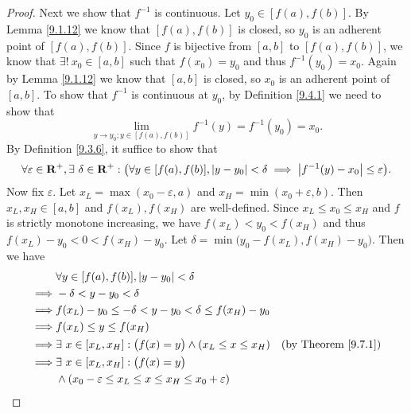 \begin{proof}
    Next we show that \(f^{-1}\) is continuous.
    Let \(y_0 \in [f(a), f(b)]\).
    By Lemma \ref{9.1.12} we know that \([f(a), f(b)]\) is closed, so \(y_0\) is an adherent point of \([f(a), f(b)]\).
    Since \(f\) is bijective from \([a, b]\) to \([f(a), f(b)]\), we know that \(\exists!\ x_0 \in [a, b]\) such that \(f(x_0) = y_0\) and thus \(f^{-1}(y_0) = x_0\).
    Again by Lemma \ref{9.1.12} we know that \([a, b]\) is closed, so \(x_0\) is an adherent point of \([a, b]\).
    To show that \(f^{-1}\) is continuous at \(y_0\), by Definition \ref{9.4.1} we need to show that
    \[
        \lim_{y \to y_0 ; y \in [f(a), f(b)]} f^{-1}(y) = f^{-1}(y_0) = x_0.
    \]
    By Definition \ref{9.3.6}, it suffice to show that
    \[
        \forall \varepsilon \in \mathbf{R}^+, \exists\ \delta \in \mathbf{R}^+ : \big(\forall y \in [f(a), f(b)], \abs*{y - y_0} < \delta \implies \abs*{f^{-1}(y) - x_0} \leq \varepsilon\big).
    \]
    Now fix \(\varepsilon\).
    Let \(x_L = \max(x_0 - \varepsilon, a)\) and \(x_H = \min(x_0 + \varepsilon, b)\).
    Then \(x_L, x_H \in [a, b]\) and \(f(x_L), f(x_H)\) are well-defined.
    Since \(x_L \leq x_0 \leq x_H\) and \(f\) is strictly monotone increasing, we have \(f(x_L) < y_0 < f(x_H)\) and thus \(f(x_L) - y_0 < 0 < f(x_H) - y_0\).
    Let \(\delta = \min\big(y_0 - f(x_L), f(x_H) - y_0\big)\).
    Then we have
    \begin{align*}
                 & \forall y \in [f(a), f(b)], \abs*{y - y_0} < \delta                                                                                 \\
        \implies & -\delta < y - y_0 < \delta                                                                                                          \\
        \implies & f(x_L) - y_0 \leq -\delta < y - y_0 < \delta \leq f(x_H) - y_0                                                                      \\
        \implies & f(x_L) \leq y \leq f(x_H)                                                                                                           \\
        \implies & \exists\ x \in [x_L, x_H] : \big(f(x) = y\big) \land (x_L \leq x \leq x_H)                        & \text{(by Theorem \ref{9.7.1})} \\
        \implies & \exists\ x \in [x_L, x_H] : \big(f(x) = y\big)                                                                                      \\
                 & \land (x_0 - \varepsilon \leq x_L \leq x \leq x_H \leq x_0 + \varepsilon)                                                           \\

\end{align*}
\end{proof}
